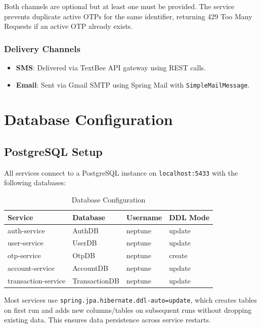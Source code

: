\documentclass[12pt,a4paper]{report}
\begin{document}
Both channels are optional but at least one must be provided. The service prevents duplicate active OTPs for the same identifier, returning 429 Too Many Requests if an active OTP already exists.

\subsection{Delivery Channels}
\begin{itemize}
    \item \textbf{SMS}: Delivered via TextBee API gateway using REST calls.
    \item \textbf{Email}: Sent via Gmail SMTP using Spring Mail with \texttt{SimpleMailMessage}.
\end{itemize}

\chapter{Database Configuration}

\section{PostgreSQL Setup}
All services connect to a PostgreSQL instance on \texttt{localhost:5433} with the following databases:

\begin{table}[H]
\centering
\caption{Database Configuration}
\begin{tabularx}{\textwidth}{llll}
\toprule
\textbf{Service} & \textbf{Database} & \textbf{Username} & \textbf{DDL Mode} \\
\midrule
auth-service & AuthDB & neptune & update \\
user-service & UserDB & neptune & update \\
otp-service & OtpDB & neptune & create \\
account-service & AccountDB & neptune & update \\
transaction-service & TransactionDB & neptune & update \\
\bottomrule
\end{tabularx}
\end{table}

\begin{infobox}
Most services use \texttt{spring.jpa.hibernate.ddl-auto=update}, which creates tables on first run and adds new columns/tables on subsequent runs without dropping existing data. This ensures data persistence across service restarts.
\end{infobox}
\end{document}
